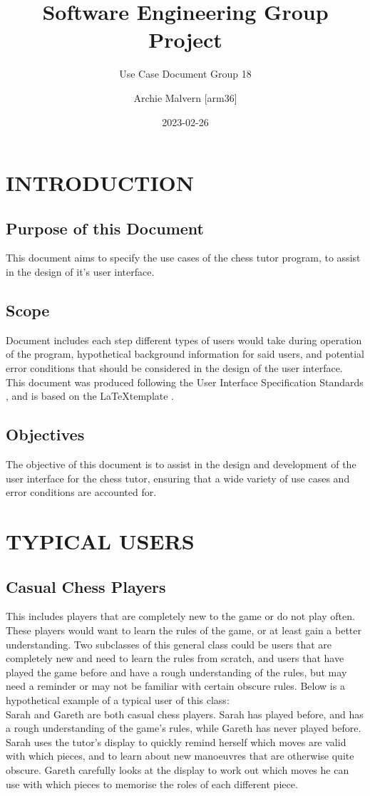 \documentclass{project}
\begin{document}
\title{Software Engineering Group Project}
\subtitle{Use Case Document Group 18}
\author{Archie Malvern [arm36]}
\date{2023-02-26}
\maketitle
\tableofcontents
\newpage
\section{INTRODUCTION}
\subsection{Purpose of this Document}
This document aims to specify the use cases of the chess tutor program, to assist in the design of it’s user interface.
\subsection{Scope}
Document includes each step different types of users would take during operation of the program, hypothetical background information for said users, and potential error conditions that should be considered in the design of the user interface.
This document was produced following the User Interface Specification Standards \cite{se.qa.04}, and is based on the \LaTeX template \cite{SE-N66-TEST}.
\subsection{Objectives}
The objective of this document is to assist in the design and development of the user interface for the chess tutor, ensuring that a wide variety of use cases and error conditions are accounted for.
\section{TYPICAL USERS}
\subsection{Casual Chess Players}
This includes players that are completely new to the game or do not play often. These players would want to learn the rules of the game, or at least gain a better understanding. Two subclasses of this general class could be users that are completely new and need to learn the rules from scratch, and users that have played the game before and have a rough understanding of the rules, but may need a reminder or may not be familiar with certain obscure rules. Below is a hypothetical example of a typical user of this class:\\
Sarah and Gareth are both casual chess players. Sarah has played before, and has a rough understanding of the game’s rules, while Gareth has never played before. Sarah uses the tutor’s display to quickly remind herself which moves are valid with which pieces, and to learn about new manoeuvres that are otherwise quite obscure. Gareth carefully looks at the display to work out which moves he can use with which pieces to memorise the roles of each different piece.
\end{document}
